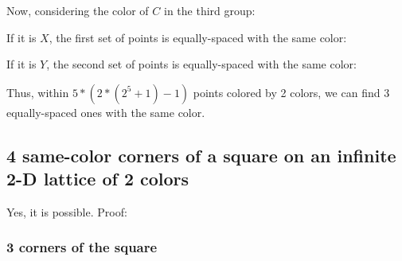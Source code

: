 \documentclass[11pt]{article}
\edef\getxnow(#1,#2){#1}
\edef\getynow(#1,#2){#2}
\newcommand*{\getx}[1]{\expandafter\getxnow#1}
\newcommand*{\gety}[1]{\expandafter\getynow#1}
\newcommand*{\scalePic}{0.4}
\newcommand*{\gridArg}[7]{%
    \foreach \x in {\fpeval{#1},\fpeval{#1+#2},...,\fpeval{#3+0.0001}} %
        \draw [black, thin, #7] (\x,\fpeval{#4}) -- (\x,\fpeval{#6+0.0001});
    \foreach \y in {\fpeval{#4},\fpeval{#4+#5},...,\fpeval{#6+0.0001}}
        \draw [black, thin, #7] (\fpeval{#1},\y) -- (\fpeval{#3+0.0001},\y);
}
\newcommand*{\grid}[6]{\gridArg{#1}{#2}{#3}{#4}{#5}{#6}{}}%
\newcommand*{\mybigbox}[4]{\grid{#1}{#3}{#1+#3}{#2}{#4}{#2+#4}} %
\newcommand*{\mybox}[2]{\mybigbox{#1}{#2}{1}{1}} %
\newcommand*{\myboxes}[1]{\foreach \pt in {#1} {\mybox{\getx{\pt}}{\gety{\pt}}}}
\newcommand*{\labelabove}[3]{\node[above, outer sep=5pt] at (#1 + 0.5, #2 + 0.5){#3};} %
\begin{document}
\begin{center}
\end{center}

Now, considering the color of $C$ in the third group:

If it is $X$, the first set of points is equally-spaced with the same color:
\begin{center}
\end{center}

If it is $Y$, the second set of points is equally-spaced with the same color:
\begin{center}
\end{center}

Thus, within $5*(2*(2^5+1)-1)$ points colored by 2 colors, we can find 3 equally-spaced ones with the same color.


\pagebreak
\subsection*{4 same-color corners of a square on an infinite 2-D lattice of 2 colors}

Yes, it is possible.
Proof:

\subsubsection*{3 corners of the square}
\end{document}
